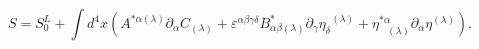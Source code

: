 \begin{equation}
S=S_{0}^{L}+\int d^{4}x\left( A^{*\alpha (\lambda )}\partial _{\alpha
}C_{(\lambda )}+\varepsilon ^{\alpha \beta \gamma \delta }B_{\alpha \beta
(\lambda )}^{*}\partial _{\gamma }\eta _{\delta }^{\;\;(\lambda )}+\eta
_{\;\;\;(\lambda )}^{*\alpha }\partial _{\alpha }\eta ^{(\lambda )}\right) .
\label{cin3}
\end{equation}

